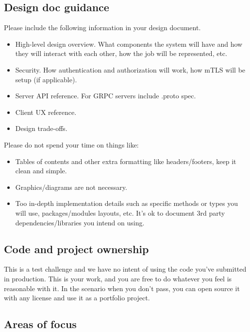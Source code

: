 \documentclass{article}
\begin{document}
\subsection{Design doc guidance}

Please include the following information in your design document.

  \begin{itemize}
    \item High-level design overview. What components the system will have and how they will interact with each other, how the job will be represented, etc.
    \item Security. How authentication and authorization will work, how mTLS will be setup (if applicable).
    \item Server API reference. For GRPC servers include .proto spec.
    \item Client UX reference.
    \item Design trade-offs.
  \end{itemize}

Please do not spend your time on things like:

  \begin{itemize}
    \item Tables of contents and other extra formatting like headers/footers, keep it clean and simple.
    \item Graphics/diagrams are not necessary.
    \item Too in-depth implementation details such as specific methods or types you will use, packages/modules layouts, etc. It's ok to document 3rd party dependencies/libraries you intend on using.
  \end{itemize}

\subsection{Code and project ownership}

This is a test challenge and we have no intent of using the code you've submitted in production.
This is your work, and you are free to do whatever you feel is reasonable with it.
In the scenario when you don't pass, you can open source it with any license and use it as a portfolio project.

\subsection{Areas of focus}
\end{document}
